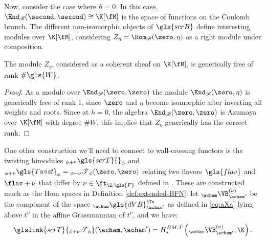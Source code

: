  
Now, consider the case where $\hbar=0$.  In this case,
$\End_{\mathscr{B}}(\second,\second)\cong \K[\fM]$ is the space of functions on the
  Coulomb branch.  The different non-isomorphic objects of
  $\gls{scrB}$ define interesting modules over $\K[\fM]$, considering
  $Z_{\eta}=\Hom_{\mathscr{B}}(\zero,\eta)$ as a right module under composition.   
\begin{lemma}\label{lem:Q-rank}
  The module $Z_{\eta}$, considered as a coherent sheaf on $\K[\fM]$, is generically free of rank $\# \gls{W}$.
\end{lemma} 
\begin{proof}
  As a module over $\End_{\mathscr{B}}(\zero,\zero)$ the module $\End_{\mathscr{B}}(\zero,\eta)$ is generically free of rank 1, since $\zero$ and $\eta$ become isomorphic after inverting all weights and roots.  Since at $h=0$, the algebra $\End_{\mathscr{B}}(\zero,\zero)$ is Azumaya over $\K[\fM]$ with degree $\#W$, this implies that $Z_{\eta}$ generically has the correct rank.  
\end{proof}

One other construction we'll need to connect to wall-crossing functors
is the twisting bimodules 
  ${}_{\phi+\nu}\gls{scrT}{}_{\phi}$ 
and
${}_{\phi+\nu}\gls{Twist}_{\phi}={}_{\phi+\nu}\mathscr{T}{}_{\phi}(\zero,\zero)$ relating two flavors $\gls{flav}$ and
$\flav+\nu$ that differ by $\nu\in \ft_{\Z,\gls{F}}$
defined in \cite[Def. 3.16]{WebSD}.
These are constructed much as the Hom spaces in Definition
\ref{def:extended-BFN}: let ${}_{\acham}\VB^{(\nu)}_{\acham'}$ be the
component of the space ${}_{\acham}\gls{dVB}^{\To}_{\acham'}$  as defined in
\eqref{eq:aXa} lying above $t^\nu$ in the affine Grassmannian of
$t^\nu$, and we have:
\begin{equation}
  \label{eq:aXnua}
 \glslink{scrT}{ {}_{\phi+\nu}\mathscr{T}{}_{\phi}}(\acham,\acham')=  H_*^{BM, \tilde T}\left({}_{\acham}\VB^{(\nu)}_{\acham'}; 
    \K\right).
\end{equation}


